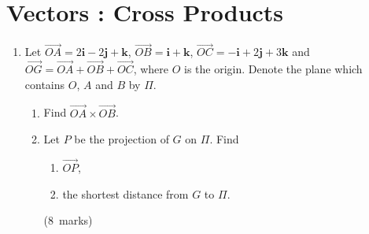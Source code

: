 \documentclass[12pt, a4paper]{article} %
\newcommand{\qmarks}[1]{\leavevmode\unskip\hspace*{\fill}\mbox{(#1 marks)}}
\begin{document}
\section{Vectors : Cross Products}
\begin{enumerate}
    \item Let \(\overrightarrow{OA}=2\mathbf{i}-2\mathbf{j}+\mathbf{k}\), \(\overrightarrow{OB}=\mathbf{i}+\mathbf{k}\), \(\overrightarrow{OC}=-\mathbf{i}+2\mathbf{j}+3\mathbf{k}\) and \(\overrightarrow{OG}=\overrightarrow{OA}+\overrightarrow{OB}+\overrightarrow{OC}\), where \(O\) is the origin. Denote the plane which contains \(O\), \(A\) and \(B\) by \(\varPi\).
    \begin{enumerate}
        \item Find \(\overrightarrow{OA}\times\overrightarrow{OB}\).
        \item Let \(P\) be the projection of \(G\) on \(\varPi\). Find
        \begin{enumerate}[label=(\roman*)]
            \item \(\overrightarrow{OP}\),
            \item the shortest distance from \(G\) to \(\varPi\).
        \end{enumerate}\qmarks{8}
    \end{enumerate}
    

\end{enumerate}
\end{document}
